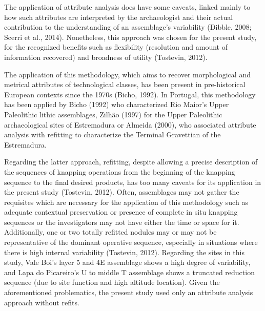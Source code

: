 \documentclass[12pt,twoside]{reedthesis}
\begin{document}
The application of attribute analysis does have some caveats, linked mainly to how such attributes are interpreted by the archaeologist and their actual contribution to the understanding of an assemblage's variability (Dibble, 2008; Scerri et al., 2014). Nonetheless, this approach was chosen for the present study, for the recognized benefits such as flexibility (resolution and amount of information recovered) and broadness of utility (Tostevin, 2012).

The application of this methodology, which aims to recover morphological and metrical attributes of technological classes, has been present in pre-historical European contexts since the 1970s (Bicho, 1992). In Portugal, this methodology has been applied by Bicho (1992) who characterized Rio Maior's Upper Paleolithic lithic assemblages, Zilhão (1997) for the Upper Paleolithic archaeological sites of Estremadura or Almeida (2000), who associated attribute analysis with refitting to characterize the Terminal Gravettian of the Estremadura.

Regarding the latter approach, refitting, despite allowing a precise description of the sequences of knapping operations from the beginning of the knapping sequence to the final desired products, has too many caveats for its application in the present study (Tostevin, 2012). Often, assemblages may not gather the requisites which are necessary for the application of this methodology such as adequate contextual preservation or presence of complete in situ knapping sequences or the investigators may not have either the time or space for it. Additionally, one or two totally refitted nodules may or may not be representative of the dominant operative sequence, especially in situations where there is high internal variability (Tostevin, 2012). Regarding the sites in this study, Vale Boi's layer 5 and 4E assemblage shows a high degree of variability, and Lapa do Picareiro's U to middle T assemblage shows a truncated reduction sequence (due to site function and high altitude location). Given the aforementioned problematics, the present study used only an attribute analysis approach without refits.
\end{document}
